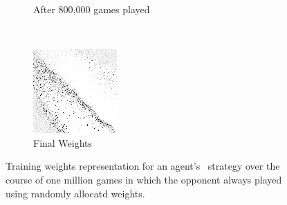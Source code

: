 \begin{figure}
\begin{subfigure}[t]{0.3\textwidth}
	\caption{After 800,000 games played}
	\end{subfigure}
	~
	\begin{subfigure}[t]{0.3\textwidth}
	\includegraphics[width=\textwidth]{images/findings/round2/flipbook/random/checkpoint_999999.png}
	\caption{Final Weights}
	\end{subfigure}

\caption{
	Training weights representation for an agent's \handmaxavg\ strategy
	over the course of one million games
	in which the opponent always played using randomly allocatd weights.
}
\label{fig:r2-flip-random}
\end{figure}
